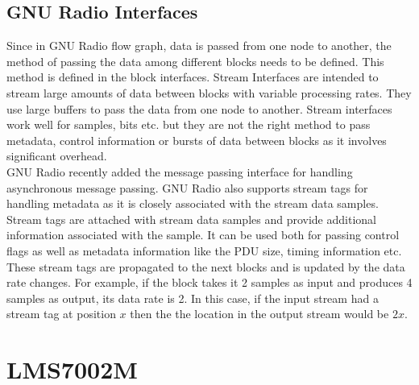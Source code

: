 \subsection {GNU Radio Interfaces}
Since in GNU Radio flow graph, data is passed from one node to another, the method of passing the data among different blocks needs to be defined.
This method is defined in the block interfaces.
Stream Interfaces are intended to stream large amounts of data between blocks with variable processing rates.
They use large buffers to pass the data from one node to another.
Stream interfaces work well for samples, bits etc. but they are not the right method to pass metadata, control information or bursts of data between blocks as it involves significant overhead.\\

GNU Radio recently added the message passing interface for handling asynchronous message passing.
GNU Radio also supports stream tags for handling metadata as it is closely associated with the stream data samples.
Stream tags are attached with stream data samples and provide additional information associated with the sample.
It can be used both for passing control flags as well as metadata information like the \ac{PDU} size, timing information etc.
These stream tags are propagated to the next blocks and is updated by the data rate changes.
For example, if the block takes it 2 samples as input and produces 4 samples as output, its data rate is 2.
In this case, if the input stream had a stream tag at position $x$ then the the location in the output stream would be $2x$. \\

\section{LMS7002M} \label{A.3}

